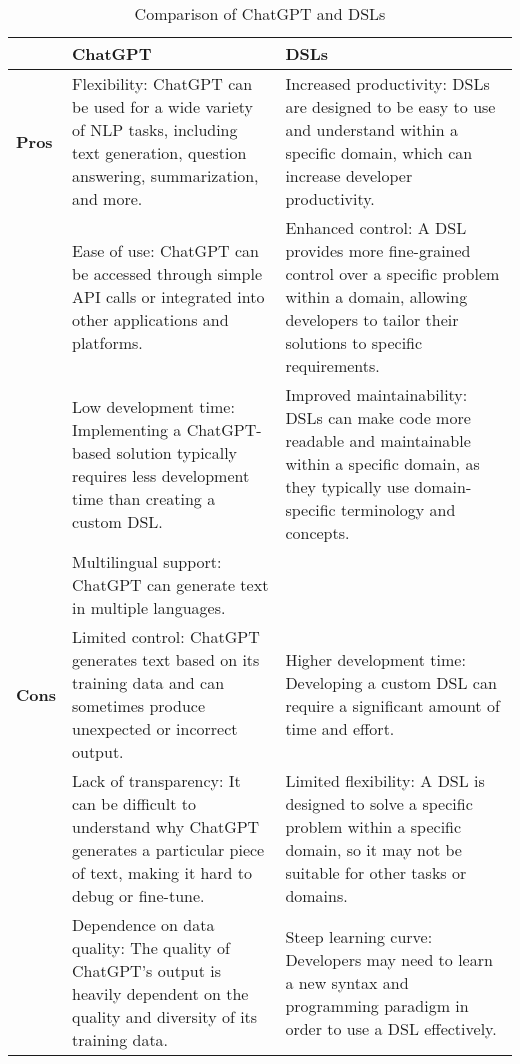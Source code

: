 \documentclass[9pt, oneside]{article}   	%
\theoremstyle{definition}
\begin{document}
\begin{table}[ht]
\label{comparison}
\centering
\small %
\begin{tabular}{|l|p{6cm}|p{6cm}|}
\hline
 & \textbf{ChatGPT} & \textbf{DSLs} \\
\hline
\textbf{Pros} & 
Flexibility: ChatGPT can be used for a wide variety of NLP tasks, including text generation, question answering, summarization, and more.
&
Increased productivity: DSLs are designed to be easy to use and understand within a specific domain, which can increase developer productivity. \\
\cline{2-3}
& 
Ease of use: ChatGPT can be accessed through simple API calls or integrated into other applications and platforms.
&
Enhanced control: A DSL provides more fine-grained control over a specific problem within a domain, allowing developers to tailor their solutions to specific requirements. \\
\cline{2-3}
& 
Low development time: Implementing a ChatGPT-based solution typically requires less development time than creating a custom DSL.
&
Improved maintainability: DSLs can make code more readable and maintainable within a specific domain, as they typically use domain-specific terminology and concepts. \\
\cline{2-3}
& 
Multilingual support: ChatGPT can generate text in multiple languages.
&
 \\
\hline
\textbf{Cons} & 
Limited control: ChatGPT generates text based on its training data and can sometimes produce unexpected or incorrect output.
&
Higher development time: Developing a custom DSL can require a significant amount of time and effort. \\
\cline{2-3}
& 
Lack of transparency: It can be difficult to understand why ChatGPT generates a particular piece of text, making it hard to debug or fine-tune.
&
Limited flexibility: A DSL is designed to solve a specific problem within a specific domain, so it may not be suitable for other tasks or domains. \\
\cline{2-3}
& 
Dependence on data quality: The quality of ChatGPT's output is heavily dependent on the quality and diversity of its training data.
&
Steep learning curve: Developers may need to learn a new syntax and programming paradigm in order to use a DSL effectively. \\
\hline
\end{tabular}
\caption{Comparison of ChatGPT and DSLs}
\label{tab:chatgpt-dsls}
\end{table}
\end{document}
